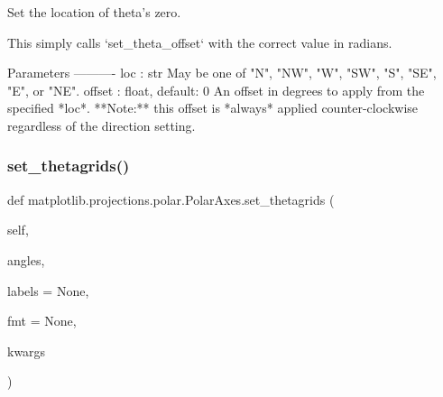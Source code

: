 \begin{DoxyVerb}Set the location of theta's zero.

This simply calls `set_theta_offset` with the correct value in radians.

Parameters
----------
loc : str
    May be one of "N", "NW", "W", "SW", "S", "SE", "E", or "NE".
offset : float, default: 0
    An offset in degrees to apply from the specified *loc*. **Note:**
    this offset is *always* applied counter-clockwise regardless of
    the direction setting.
\end{DoxyVerb}
 \mbox{\label{classmatplotlib_1_1projections_1_1polar_1_1PolarAxes_aba18ea7e01d14da38ab6b755642e256b}} 
\subsubsection{\texorpdfstring{set\+\_\+thetagrids()}{set\_thetagrids()}}
{\footnotesize\ttfamily def matplotlib.\+projections.\+polar.\+Polar\+Axes.\+set\+\_\+thetagrids (\begin{DoxyParamCaption}\item[{}]{self,  }\item[{}]{angles,  }\item[{}]{labels = {\ttfamily None},  }\item[{}]{fmt = {\ttfamily None},  }\item[{}]{kwargs }\end{DoxyParamCaption})}

